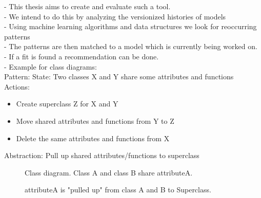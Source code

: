 \documentclass[10pt,a4paper,oneside]{scrartcl}
\begin{document}
	- This thesis aims to create and evaluate such a tool.
	\\
	- We intend to do this by analyzing the versionized histories of models
	\\
	- Using machine learning algorithms and data structures we look for reoccurring patterns
	\\
	- The patterns are then matched to a model which is currently being worked on. 
	\\
	- If a fit is found a recommendation can be done.
	\\
	- Example for class diagrams:\\
	Pattern:
	State: Two classes X and Y share some attributes and functions\\
	Actions: \\
	\begin{itemize}
		\item Create superclass Z for X and Y
		\item Move shared attributes and functions from Y to Z
		\item Delete the same attributes and functions from X
	\end{itemize}
	Abstraction: Pull up shared attributes/functions to superclass
	\begin{figure}
		\centering
		\caption{Class diagram. Class A and class B share attributeA.}
		\label{fig:classDiag1}
	\end{figure}
	
	\begin{figure}
		\centering
		\caption{attributeA is "pulled up" from class A and B to Superclass. }
		\label{fig:classDiag2}
	\end{figure}
	
\end{document}
